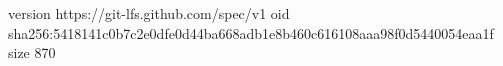 version https://git-lfs.github.com/spec/v1
oid sha256:5418141c0b7c2e0dfe0d44ba668adb1e8b460c616108aaa98f0d5440054eaa1f
size 870
